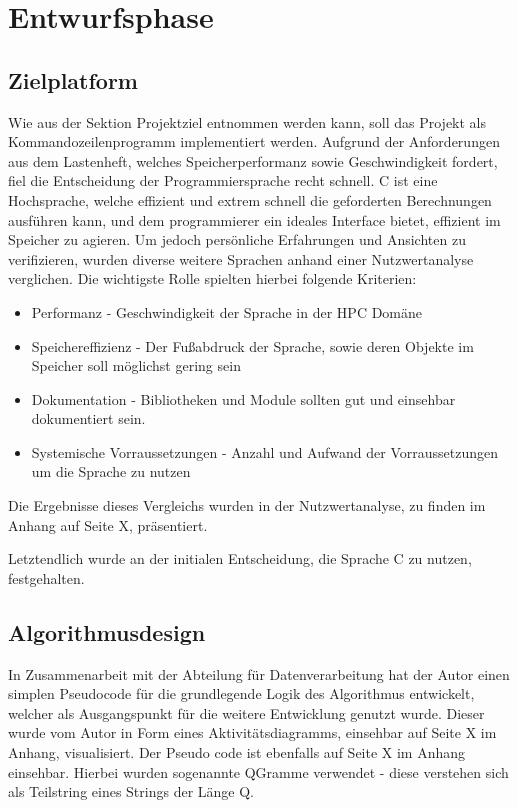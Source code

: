 \section{Entwurfsphase}


\subsection{Zielplatform}
Wie aus der Sektion Projektziel entnommen werden kann, soll das Projekt als Kommandozeilenprogramm
implementiert werden. Aufgrund der Anforderungen aus dem Lastenheft, welches Speicherperformanz sowie Geschwindigkeit fordert,
fiel die Entscheidung der Programmiersprache recht schnell. C ist eine Hochsprache, welche effizient und extrem schnell
die geforderten Berechnungen ausführen kann, und dem programmierer ein ideales Interface bietet, effizient im Speicher zu agieren.
Um jedoch persönliche Erfahrungen und Ansichten zu verifizieren, wurden diverse weitere Sprachen anhand einer
Nutzwertanalyse verglichen. Die wichtigste Rolle spielten hierbei folgende Kriterien:
\begin{itemize}
    \item Performanz - Geschwindigkeit der Sprache in der HPC Domäne
    \item Speichereffizienz - Der Fußabdruck der Sprache, sowie deren Objekte im Speicher soll möglichst gering sein
    \item Dokumentation - Bibliotheken und Module sollten gut und einsehbar dokumentiert sein.
    \item Systemische Vorraussetzungen - Anzahl und Aufwand der Vorraussetzungen um die Sprache zu nutzen
\end{itemize}

Die Ergebnisse dieses Vergleichs wurden in der Nutzwertanalyse, zu finden
im Anhang auf Seite X, präsentiert.\par
Letztendlich wurde an der initialen Entscheidung, die Sprache C zu nutzen, festgehalten.

\subsection{Algorithmusdesign}
In Zusammenarbeit mit der Abteilung für Datenverarbeitung hat der Autor einen simplen
Pseudocode für die grundlegende Logik des Algorithmus entwickelt, welcher als Ausgangspunkt
für die weitere Entwicklung genutzt wurde. Dieser wurde vom Autor in Form eines
Aktivitätsdiagramms, einsehbar auf Seite X im Anhang, visualisiert.
Der Pseudo code ist ebenfalls auf Seite X im Anhang einsehbar.
Hierbei wurden sogenannte QGramme verwendet - diese verstehen sich als
Teilstring eines Strings der Länge Q.



